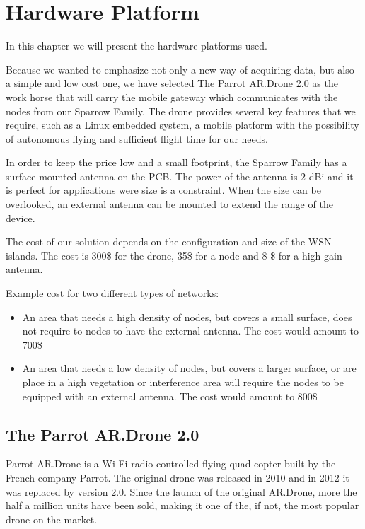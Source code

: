 \normalfont\normalsize
\chapter{Hardware Platform}

In this chapter we will present the hardware platforms used. 

Because we wanted to emphasize not only a new way of acquiring data, but also a simple and low cost one, we have selected The Parrot AR.Drone 2.0 as the work horse that will carry the mobile gateway which communicates with the nodes from our Sparrow Family. The drone provides several key features that we require, such as a Linux embedded system, a mobile platform with the possibility of autonomous flying and sufficient flight time for our needs.

In order to keep the price low and a small footprint, the Sparrow Family has a surface mounted antenna on the PCB. The power of the antenna is 2 dBi and it is perfect for applications were size is a constraint. When the size can be overlooked, an external antenna can be mounted to extend the range of the device.

The cost of our solution depends on the configuration and size of the WSN islands. The cost is 300\$ for the drone, 35\$ for a node and 8 \$ for a high gain antenna. 

Example cost for two different types of networks:
\begin{itemize}

\item An area that needs a high density of nodes, but covers a small surface, does not require to nodes to have the external antenna. The cost would amount to 700\$   

\item  An area that needs a low density of nodes, but covers a larger surface, or are place in a high vegetation or interference area will require the nodes to be equipped with an external antenna. The cost would amount to 800\$

\end{itemize}

\section{The Parrot AR.Drone 2.0}\cite{parrot2012drone}

Parrot AR.Drone is a Wi-Fi radio controlled flying quad copter built by the French company Parrot.
The original drone was released in 2010 and in 2012 it was replaced by version 2.0. Since the launch of the original AR.Drone, more the half a million units have been sold, making it one of the, if not, the most popular drone on the market.\cite{parrotpopular}

